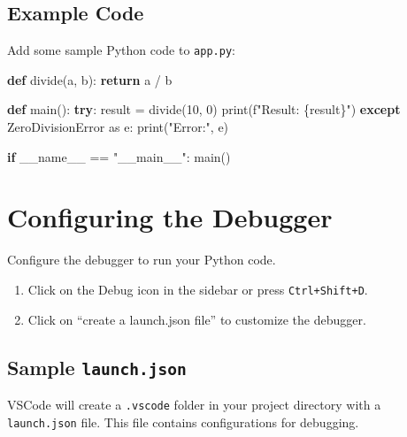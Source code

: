 \documentclass[
  letterpaper,
  DIV=11,
  numbers=noendperiod]{scrreprt}
\newenvironment{Shaded}{\begin{snugshade}}{\end{snugshade}}
\newcommand{\BuiltInTok}[1]{\textcolor[rgb]{0.00,0.23,0.31}{#1}}
\newcommand{\ControlFlowTok}[1]{\textcolor[rgb]{0.00,0.23,0.31}{\textbf{#1}}}
\newcommand{\DecValTok}[1]{\textcolor[rgb]{0.68,0.00,0.00}{#1}}
\newcommand{\ImportTok}[1]{\textcolor[rgb]{0.00,0.46,0.62}{#1}}
\newcommand{\KeywordTok}[1]{\textcolor[rgb]{0.00,0.23,0.31}{\textbf{#1}}}
\newcommand{\NormalTok}[1]{\textcolor[rgb]{0.00,0.23,0.31}{#1}}
\newcommand{\OperatorTok}[1]{\textcolor[rgb]{0.37,0.37,0.37}{#1}}
\newcommand{\PreprocessorTok}[1]{\textcolor[rgb]{0.68,0.00,0.00}{#1}}
\newcommand{\SpecialCharTok}[1]{\textcolor[rgb]{0.37,0.37,0.37}{#1}}
\newcommand{\SpecialStringTok}[1]{\textcolor[rgb]{0.13,0.47,0.30}{#1}}
\newcommand{\StringTok}[1]{\textcolor[rgb]{0.13,0.47,0.30}{#1}}
\newcommand{\VariableTok}[1]{\textcolor[rgb]{0.07,0.07,0.07}{#1}}
\providecommand{\tightlist}{%
  \setlength{\itemsep}{0pt}\setlength{\parskip}{0pt}}\usepackage{longtable,booktabs,array}
\begin{document}
\subsection{Example Code}\label{example-code}

Add some sample Python code to \texttt{app.py}:

\begin{Shaded}
\begin{Highlighting}[]
\KeywordTok{def}\NormalTok{ divide(a, b):}
    \ControlFlowTok{return}\NormalTok{ a }\OperatorTok{/}\NormalTok{ b}

\KeywordTok{def}\NormalTok{ main():}
    \ControlFlowTok{try}\NormalTok{:}
\NormalTok{        result }\OperatorTok{=}\NormalTok{ divide(}\DecValTok{10}\NormalTok{, }\DecValTok{0}\NormalTok{)}
        \BuiltInTok{print}\NormalTok{(}\SpecialStringTok{f"Result: }\SpecialCharTok{\{}\NormalTok{result}\SpecialCharTok{\}}\SpecialStringTok{"}\NormalTok{)}
    \ControlFlowTok{except} \PreprocessorTok{ZeroDivisionError} \ImportTok{as}\NormalTok{ e:}
        \BuiltInTok{print}\NormalTok{(}\StringTok{"Error:"}\NormalTok{, e)}

\ControlFlowTok{if} \VariableTok{\_\_name\_\_} \OperatorTok{==} \StringTok{"\_\_main\_\_"}\NormalTok{:}
\NormalTok{    main()}
\end{Highlighting}
\end{Shaded}

\section{Configuring the Debugger}\label{configuring-the-debugger}

Configure the debugger to run your Python code.

\begin{enumerate}
\def\labelenumi{\arabic{enumi}.}
\tightlist
\item
  Click on the Debug icon in the sidebar or press \texttt{Ctrl+Shift+D}.
\item
  Click on ``create a launch.json file'' to customize the debugger.
\end{enumerate}

\subsection{\texorpdfstring{Sample
\texttt{launch.json}}{Sample launch.json}}\label{sample-launch.json}

VSCode will create a \texttt{.vscode} folder in your project directory
with a \texttt{launch.json} file. This file contains configurations for
debugging.
\end{document}
